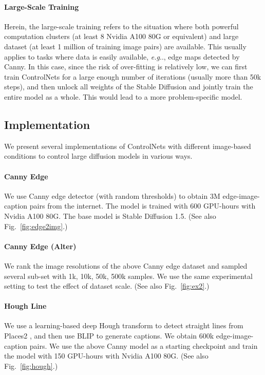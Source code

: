 \documentclass{article}
\makeatletter
\DeclareRobustCommand\onedot{\futurelet\@let@token\@onedot}
\def\@onedot{\ifx\@let@token.\else.\null\fi\xspace}
\def\eg{\emph{e.g}\onedot}
\makeatother
\begin{document}
\paragraph{Large-Scale Training}

Herein, the large-scale training refers to the situation where both powerful computation clusters (at least 8 Nvidia A100 80G or equivalent) and large dataset (at least 1 million of training image pairs) are available. This usually applies to tasks where data is easily available, \eg, edge maps detected by Canny. In this case, since the risk of over-fitting is relatively low, we can first train ControlNets for a large enough number of iterations (usually more than 50k steps), and then unlock all weights of the Stable Diffusion and jointly train the entire model as a whole. This would lead to a more problem-specific model.

\subsection{Implementation}
\label{misc}

We present several implementations of ControlNets with different image-based conditions to control large diffusion models in various ways.

\paragraph{Canny Edge} We use Canny edge detector \cite{4767851} (with random thresholds) to obtain 3M edge-image-caption pairs from the internet. The model is trained with 600 GPU-hours with Nvidia A100 80G. The base model is Stable Diffusion 1.5. (See also Fig.~\ref{fig:edge2img}.)

\paragraph{Canny Edge (Alter)} We rank the image resolutions of the above Canny edge dataset and sampled several sub-set with 1k, 10k, 50k, 500k samples. We use the same experimental setting to test the effect of dataset scale. (See also Fig.~\ref{fig:ex2}.)

\paragraph{Hough Line} We use a learning-based deep Hough transform \cite{gu2021realtime} to detect straight lines from Places2 \cite{zhou2017places}, and then use BLIP \cite{li2022blip} to generate captions. We obtain 600k edge-image-caption pairs. We use the above Canny model as a starting checkpoint and train the model with 150 GPU-hours with Nvidia A100 80G. (See also Fig.~\ref{fig:hough}.)
\end{document}

